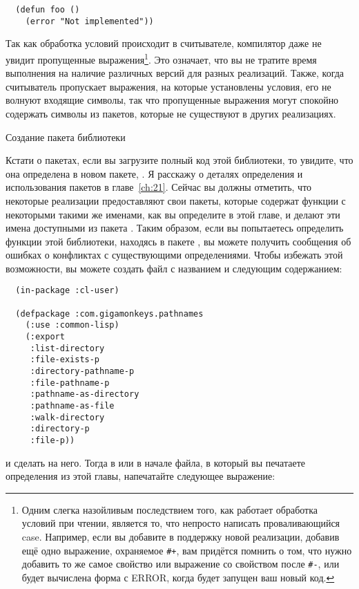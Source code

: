 \begin{lstlisting}
  (defun foo ()
    (error "Not implemented"))
\end{lstlisting}

Так как обработка условий происходит в считывателе, компилятор даже не увидит пропущенные
выражения\footnote{Одним слегка назойливым последствием того, как работает обработка
  условий при чтении, является то, что непросто написать проваливающийся case. Например,
  если вы добавите в  поддержку новой реализации, добавив ещё одно выражение,
  охраняемое \lstinline!#+!, вам придётся помнить о том, что нужно добавить то же самое
  свойство или выражение со свойством после \lstinline!#-!, или будет вычислена форма с
  ERROR, когда будет запущен ваш новый код.}. Это означает, что вы не тратите время
выполнения на наличие различных версий для разных реализаций. Также, когда считыватель
пропускает выражения, на которые установлены условия, его не волнуют входящие символы, так
что пропущенные выражения могут спокойно содержать символы из пакетов, которые не
существуют в других реализациях.

Создание пакета библиотеки

Кстати о пакетах, если вы загрузите полный код этой библиотеки, то увидите, что она
определена в новом пакете, . Я расскажу о деталях
определения и использования пакетов в главе~\ref{ch:21}. Сейчас вы должны отметить, что некоторые
реализации предоставляют свои пакеты, которые содержат функции с некоторыми такими же
именами, как вы определите в этой главе, и делают эти имена доступными из пакета
. Таким образом, если вы попытаетесь определить функции этой библиотеки,
находясь в пакете , вы можете получить сообщения об ошибках о конфликтах с
существующими определениями. Чтобы избежать этой возможности, вы можете создать файл с
названием  и следующим содержанием:

\begin{lstlisting}
  (in-package :cl-user)

  (defpackage :com.gigamonkeys.pathnames
    (:use :common-lisp)
    (:export
     :list-directory
     :file-exists-p
     :directory-pathname-p
     :file-pathname-p
     :pathname-as-directory
     :pathname-as-file
     :walk-directory
     :directory-p
     :file-p))
\end{lstlisting}

и сделать  на него. Тогда в  или в начале файла, в который вы
печатаете определения из этой главы, напечатайте следующее выражение:

